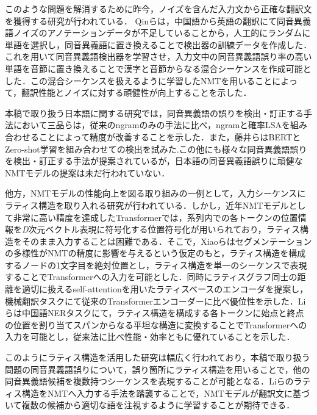 \documentclass[a4j,10.5pt, twocolumn]{jarticle}
\begin{document}
このような問題を解消するために昨今，ノイズを含んだ入力文から正確な翻訳文を獲得する研究が行われている．
Qinら\cite{Qin}は，中国語から英語の翻訳にて同音異義語ノイズのアノテーションデータが不足していることから，人工的にランダムに単語を選択し，同音異義語に置き換えることで検出器の訓練データを作成した．これを用いて同音異義語検出器を学習させ，入力文中の同音異義語誤り率の高い単語を音節に置き換えることで漢字と音節からなる混合シーケンスを作成可能とした．この混合シーケンスを扱えるように学習したNMTを用いることによって，翻訳性能とノイズに対する頑健性が向上することを示した．

本稿で取り扱う日本語に関する研究では，同音異義語の誤りを検出・訂正する手法において三品ら\cite{Mishina}は，従来のngramのみの手法に比べ，ngramと確率LSAを組み合わせることによって精度が改善することを示した．また，藤井ら\cite{Fujii}はBERTとZero-shot学習を組み合わせての検出を試みた.この他にも様々な同音異義語誤りを検出・訂正する手法が提案されているが，日本語の同音異義語誤りに頑健なNMTモデルの提案は未だ行われていない．

他方，NMTモデルの性能向上を図る取り組みの一例として，入力シーケンスにラティス構造を取り入れる研究が行われている．しかし，近年NMTモデルとして非常に高い精度を達成したTransformerでは，系列内での各トークンの位置情報を\textit{D}次元ベクトル表現に符号化する位置符号化が用いられており\cite{Vaswani}，ラティス構造をそのまま入力することは困難である\cite{Xiao}．そこで，Xiaoら\cite{Xiao}はセグメンテーションの多様性がNMTの精度に影響を与えるという仮定のもと，ラティス構造を構成するノードの1文字目を絶対位置とし，ラティス構造を単一のシーケンスで表現することでTransformerへの入力を可能とした．同時にラティスグラフ同士の距離を適切に扱えるself-attentionを用いたラティスベースのエンコーダを提案し，機械翻訳タスクにて従来のTransformerエンコーダーに比べ優位性を示した．Liら\cite{Li}は中国語NERタスクにて，ラティス構造を構成する各トークンに始点と終点の位置を割り当てスパンからなる平坦な構造に変換することでTransformerへの入力を可能とし，従来法に比べ性能・効率ともに優れていることを示した．

このようにラティス構造を活用した研究は幅広く行われており，本稿で取り扱う問題の同音異義語誤りについて，誤り箇所にラティス構造を用いることで，他の同音異義語候補を複数持つシーケンスを表現することが可能となる．Liら\cite{Li}のラティス構造をNMTへ入力する手法を踏襲することで，NMTモデルが翻訳文に基づいて複数の候補から適切な語を注視するように学習することが期待できる．
\end{document}
